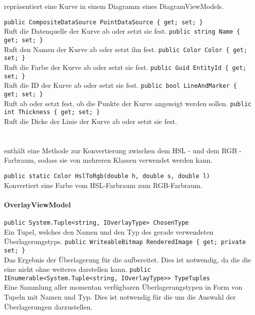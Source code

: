 \paragraph{}~\\
 repräsentiert eine Kurve in einem Diagramm eines DiagramViewModels.
\begin{itemize}
	\add \verb!public CompositeDataSource PointDataSource { get; set; }! \\
	Ruft die Datenquelle der Kurve ab oder setzt sie fest.
	\add \verb!public string Name { get; set; }! \\
	Ruft den Namen der Kurve ab oder setzt ihn fest.
	\add \verb!public Color Color { get; set; }! \\
	Ruft die Farbe der Kurve ab oder setzt sie fest.
	\add \verb!public Guid EntityId { get; set; }! \\
	Ruft die ID der Kurve ab oder setzt sie fest.
	\add \verb!public bool LineAndMarker { get; set; }! \\
	Ruft ab oder setzt fest, ob die Punkte der Kurve angezeigt werden sollen.
	\add \verb!public int Thickness { get; set; }! \\
	Ruft die Dicke der Linie der Kurve ab oder setzt sie fest.
\end{itemize}

\paragraph{}~\\
 enthält eine Methode zur Konvertierung zwischen dem HSL - und dem RGB - Farbraum, sodass sie von mehreren Klassen verwendet werden kann.
\begin{itemize}
	\add \verb!public static Color HslToRgb(double h, double s, double l)! \\
	Konvertiert eine Farbe vom HSL-Farbraum zum RGB-Farbraum.
\end{itemize}

\paragraph{\name OverlayViewModel}

\begin{itemize}
	\add \verb!public System.Tuple<string, IOverlayType> ChosenType! \\
	Ein Tupel, welches den Namen und den Typ des gerade verwendeten Überlagerungstyps.
	\add \verb!public WriteableBitmap RenderedImage { get; private set; }! \\
	Das Ergebnis der Überlagerung für die  aufbereitet. Dies ist notwendig, da die die  eine  nicht ohne weiteres darstellen kann.
	\add \verb!public IEnumerable<System.Tuple<string, IOverlayType>> TypeTuples! \\
	Eine Sammlung aller momentan verfügbaren Überlagerungstypen in Form von Tupeln mit Namen und Typ. Dies ist notwendig für die  um die Auswahl der Überlagerungen darzustellen.
\end{itemize}

